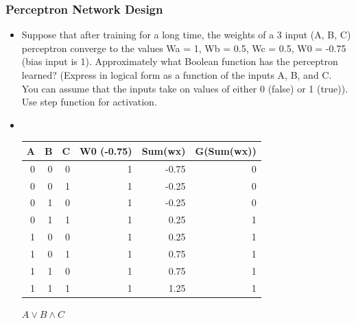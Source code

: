 \documentclass[compress, 9pt]{beamer}
\begin{document}
\begin{frame}
\frametitle{Perceptron Network Design}
\label{sec-1-4}
\begin{itemize}

\item <1-> Suppose that after training for a long time, the weights of a 3 input (A, B, C) perceptron converge to the values Wa = 1, Wb = 0.5, Wc = 0.5, W0 = -0.75 (bias input is 1). Approximately what Boolean function has the perceptron learned? (Express in logical form as a function of the inputs A, B, and C. You can assume that the inputs take on values of either 0 (false) or 1 (true)). Use step function for activation.
\label{sec-1-4-1}%

\item <2->\\
\label{sec-1-4-2}%
\begin{center}
\begin{tabular}{rrrrrr}
\hline
 A  &  B  &  C  &  W0 (-0.75)  &  Sum(wx)  &  G(Sum(wx))  \\
\hline
 0  &  0  &  0  &           1  &    -0.75  &           0  \\
 0  &  0  &  1  &           1  &    -0.25  &           0  \\
 0  &  1  &  0  &           1  &    -0.25  &           0  \\
 0  &  1  &  1  &           1  &     0.25  &           1  \\
 1  &  0  &  0  &           1  &     0.25  &           1  \\
 1  &  0  &  1  &           1  &     0.75  &           1  \\
 1  &  1  &  0  &           1  &     0.75  &           1  \\
 1  &  1  &  1  &           1  &     1.25  &           1  \\
\hline
\end{tabular}
\end{center}



$A \vee B \wedge C$

\end{itemize} %
\end{frame}
\end{document}
